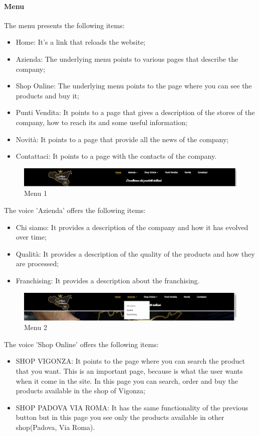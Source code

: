 \paragraph{Menu}
The menu presents the following items: 
\begin{itemize}
	\item Home: It's a link that reloads the website;
	\item Azienda: The underlying menu points to various pages that describe the company;
	\item Shop Online: The underlying menu points to the page where you can see the products and buy it;
	\item Punti Vendita: It points to a page that gives a description of the stores of the company, how to reach its and some useful information;
	\item Novità: It points to a page that provide all the news of the company;
	\item Contattaci: It points to a page with the contacts of the company.
\end{itemize}

\begin{figure}[H]
	\centering\includegraphics[width=12cm]{Img/menu.png}
	\caption{Menu 1}
\end{figure}

The voice 'Azienda' offers the following items:
\begin{itemize}
	\item Chi siamo: It provides a description of the company and how it has evolved over time;
	\item Qualità: It provides a description of the quality of the products and how they are processed;
	\item Franchising: It provides a description about the franchising.
\end{itemize}

\begin{figure}[H]
	\centering\includegraphics[width=12cm]{Img/menu2.png}
	\caption{Menu 2}
\end{figure}

The voice 'Shop Online' offers the following items:
\begin{itemize}
	\item SHOP VIGONZA: It points to the page where you can search the product that you want. This is an important page, because is what the user wants when it come in the site. In this page you can search, order and buy the products available in the shop of Vigonza;
	\item SHOP PADOVA VIA ROMA: It has the same functionality of the previous button but in this page you see only the products available in other shop(Padova, Via Roma).
\end{itemize}

